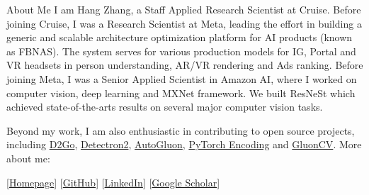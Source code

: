 \documentclass{resume} %
\begin{document}
\begin{rSection}{About Me}
I am Hang Zhang, a Staff Applied Research Scientist at Cruise. 
Before joining Cruise, I was a Research Scientist at Meta, leading the effort in building a generic and scalable architecture optimization platform for AI products (known as FBNAS). The system serves for various production models for IG, Portal and VR headsets in person understanding, AR/VR rendering and Ads ranking.
Before joining Meta, I was a Senior Applied Scientist in Amazon AI, where I worked on computer vision, deep learning and MXNet framework. We built ResNeSt which achieved state-of-the-arts results on several major computer vision tasks.


Beyond my work, I am also enthusiastic in contributing to open source projects, including \href{https://github.com/facebookresearch/d2go}{D2Go}, \href{https://github.com/facebookresearch/detectron2}{Detectron2}, \href{https://github.com/awslabs/autogluon/}{AutoGluon}, \href{https://github.com/zhanghang1989/PyTorch-Encoding}{PyTorch Encoding} and \href{https://github.com/dmlc/gluon-cv}{GluonCV}. More about me:


[\href{https://hangzhang.org/}{Homepage}] [\href{https://github.com/zhanghang1989}{GitHub}] 
[\href{https://www.linkedin.com/in/zhanghang0704}{LinkedIn}] 
[\href{https://scholar.google.com/citations?user=gCoWdkUAAAAJ}{Google Scholar}]
\end{rSection}


\newcommand{\RNum}[1]{\uppercase\expandafter{\romannumeral #1\relax}}
\end{document}
